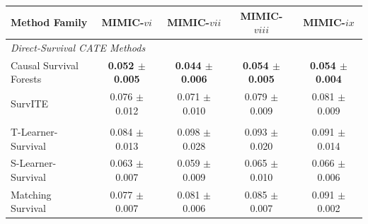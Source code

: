 \documentclass{article} %
\begin{document}
\begin{table}[!ht]
        \begin{subtable}{\linewidth}
        \centering
        \begin{tabular}{lcccc}
        \toprule
        \textbf{Method Family} & \textbf{MIMIC-$vi$} & \textbf{MIMIC-$vii$} & \textbf{MIMIC-$viii$} & \textbf{MIMIC-$ix$} \\
        \midrule
        \multicolumn{5}{l}{\textit{Direct-Survival CATE Methods}} \\
                Causal Survival Forests & \textbf{0.052 $\pm$ 0.005} & \textbf{0.044 $\pm$ 0.006} & \textbf{0.054 $\pm$ 0.005} & \textbf{0.054 $\pm$ 0.004} \\ 
                SurvITE & 0.076 $\pm$ 0.012 & 0.071 $\pm$ 0.010 & 0.079 $\pm$ 0.009 & 0.081 $\pm$ 0.009 \\ 
        \addlinespace
        \multicolumn{5}{l}{\textit{Survival Meta-Learners}} \\
                T-Learner-Survival & 0.084 $\pm$ 0.013 & 0.098 $\pm$ 0.028 & 0.093 $\pm$ 0.020 & 0.091 $\pm$ 0.014 \\ 
                S-Learner-Survival & 0.063 $\pm$ 0.007 & 0.059 $\pm$ 0.009 & 0.065 $\pm$ 0.010 & 0.066 $\pm$ 0.006 \\ 
                Matching Survival & 0.077 $\pm$ 0.007 & 0.081 $\pm$ 0.006 & 0.085 $\pm$ 0.007 & 0.091 $\pm$ 0.002 \\ 
        \bottomrule
        \end{tabular}
        \end{subtable}
\end{table}
\end{document}
